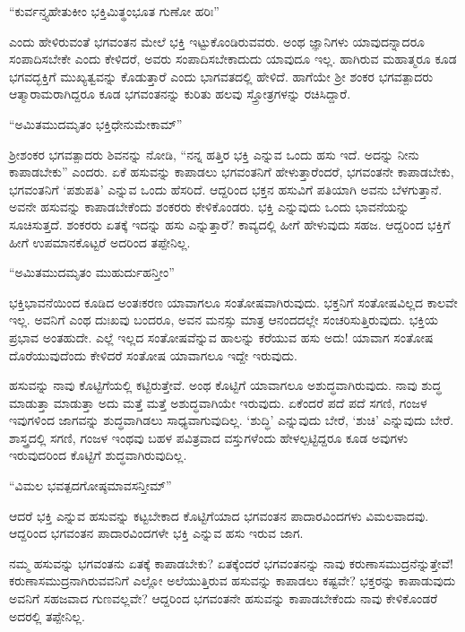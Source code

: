 \begin{shloka}
``ಕುರ್ವನ್ತ್ಯಹೇತುಕೀಂ ಭಕ್ತಿಮಿತ್ಥಂಭೂತ ಗುಣೋ ಹರಿಃ''
\end{shloka}

ಎಂದು ಹೇಳಿರುವಂತೆ ಭಗವಂತನ ಮೇಲೆ ಭಕ್ತಿ ಇಟ್ಟುಕೊಂಡಿರುವವರು. ಅಂಥ ಜ್ಞಾನಿಗಳು ಯಾವುದನ್ನಾದರೂ ಸಂಪಾದಿಸಬೇಕೇ ಎಂದು ಕೇಳಿದರೆ, ಅವರು ಸಂಪಾದಿಸಬೇಕಾದುದು ಯಾವುದೂ ಇಲ್ಲ. ಹಾಗಿರುವ ಮಹಾತ್ಮರೂ ಕೂಡ ಭಗವದ್ಭಕ್ತಿಗೆ ಮುಖ್ಯತ್ವವನ್ನು ಕೊಡುತ್ತಾರೆ ಎಂದು ಭಾಗವತದಲ್ಲಿ ಹೇಳಿದೆ. ಹಾಗೆಯೇ ಶ್ರೀ ಶಂಕರ ಭಗವತ್ಪಾದರು ಆತ್ಮಾರಾಮರಾಗಿದ್ದರೂ ಕೂಡ ಭಗವಂತನನ್ನು ಕುರಿತು ಹಲವು ಸ್ತ್ರೋತ್ರಗಳನ್ನು ರಚಿಸಿದ್ದಾರೆ.

\begin{shloka}
``ಅಮಿತಮುದಮೃತಂ ಭಕ್ತಿಧೇನುಮೇಕಾಮ್''
\end{shloka}

ಶ್ರೀಶಂಕರ ಭಗವತ್ಪಾದರು ಶಿವನನ್ನು ನೋಡಿ, ``ನನ್ನ ಹತ್ತಿರ ಭಕ್ತಿ ಎನ್ನುವ ಒಂದು ಹಸು ಇದೆ. ಅದನ್ನು ನೀನು ಕಾಪಾಡಬೇಕು'' ಎಂದರು. ಏಕೆ ಹಸುವನ್ನು ಕಾಪಾಡಲು ಭಗವಂತನಿಗೆ ಹೇಳುತ್ತಾರೆಂದರೆ, ಭಗವಂತನೇ ಕಾಪಾಡಬೇಕು, ಭಗವಂತನಿಗೆ `ಪಶುಪತಿ' ಎನ್ನುವ ಒಂದು ಹೆಸರಿದೆ. ಆದ್ದರಿಂದ ಭಕ್ತನ ಹಸುವಿಗೆ ಪತಿಯಾಗಿ ಅವನು ಬೆಳಗುತ್ತಾನೆ. ಅವನೇ ಹಸುವನ್ನು ಕಾಪಾಡಬೇಕೆಂದು ಶಂಕರರು ಕೇಳಿಕೊಂಡರು. ಭಕ್ತಿ ಎನ್ನುವುದು ಒಂದು ಭಾವನೆಯನ್ನು ಸೂಚಿಸುತ್ತದೆ. ಶಂಕರರು ಏತಕ್ಕೆ ಇದನ್ನು ಹಸು ಎನ್ನುತ್ತಾರೆ? ಕಾವ್ಯದಲ್ಲಿ ಹೀಗೆ ಹೇಳುವುದು ಸಹಜ. ಆದ್ದರಿಂದ ಭಕ್ತಿಗೆ ಹೀಗೆ ಉಪಮಾನಕೊಟ್ಟರೆ ಅದರಿಂದ ತಪ್ಪೇನಿಲ್ಲ.

\begin{shloka}
``ಅಮಿತಮುದಮೃತಂ ಮುಹುರ್ದುಹನ್ತೀಂ''
\end{shloka}

ಭಕ್ತಿಭಾವನೆಯಿಂದ ಕೂಡಿದ ಅಂತಃಕರಣ ಯಾವಾಗಲೂ ಸಂತೋಷವಾಗಿರುವುದು. ಭಕ್ತನಿಗೆ ಸಂತೋಷವಿಲ್ಲದ ಕಾಲವೇ ಇಲ್ಲ. ಅವನಿಗೆ ಎಂಥ ದುಃಖವು ಬಂದರೂ, ಅವನ ಮನಸ್ಸು ಮಾತ್ರ ಆನಂದದಲ್ಲೇ ಸಂಚರಿಸುತ್ತಿರುವುದು. ಭಕ್ತಿಯ ಪ್ರಭಾವ ಅಂತಹುದೇ. ಎಲ್ಲೆ ಇಲ್ಲದ ಸಂತೋಷವೆನ್ನುವ ಹಾಲನ್ನು ಕರೆಯುವ ಹಸು ಅದು! ಯಾವಾಗ ಸಂತೋಷ ದೊರೆಯುವುದೆಂದು ಕೇಳಿದರೆ ಸಂತೋಷ ಯಾವಾಗಲೂ ಇದ್ದೇ ಇರುವುದು.

ಹಸುವನ್ನು ನಾವು ಕೊಟ್ಟಿಗೆಯಲ್ಲಿ ಕಟ್ಟಿರುತ್ತೇವೆ. ಅಂಥ ಕೊಟ್ಟಿಗೆ ಯಾವಾಗಲೂ ಅಶುದ್ಧವಾಗಿರುವುದು. ನಾವು ಶುದ್ಧ ಮಾಡುತ್ತಾ ಮಾಡುತ್ತಾ ಅದು ಮತ್ತೆ ಮತ್ತೆ ಅಶುದ್ಧವಾಗಿಯೇ ಇರುವುದು. ಏಕೆಂದರೆ ಪದೆ ಪದೆ ಸಗಣಿ, ಗಂಜಳ ಇವುಗಳಿಂದ ಜಾಗವನ್ನು ಶುದ್ಧವಾಗಿಡಲು ಸಾಧ್ಯವಾಗುವುದಿಲ್ಲ. `ಶುದ್ಧಿ' ಎನ್ನುವುದು ಬೇರೆ, `ಶುಚಿ' ಎನ್ನುವುದು ಬೇರೆ. ಶಾಸ್ತ್ರದಲ್ಲಿ ಸಗಣಿ, ಗಂಜಳ ಇಂಥವು ಬಹಳ ಪವಿತ್ರವಾದ ವಸ್ತುಗಳೆಂದು ಹೇಳಲ್ಪಟ್ಟಿದ್ದರೂ ಕೂಡ ಅವುಗಳು ಇರುವುದರಿಂದ ಕೊಟ್ಟಿಗೆ ಶುದ್ಧವಾಗಿರುವುದಿಲ್ಲ.

\begin{shloka}
``ವಿಮಲ ಭವತ್ಪದಗೋಷ್ಠಮಾವಸನ್ತೀಮ್''
\end{shloka}

ಆದರೆ ಭಕ್ತಿ ಎನ್ನುವ ಹಸುವನ್ನು ಕಟ್ಟಬೇಕಾದ ಕೊಟ್ಟಿಗೆಯಾದ ಭಗವಂತನ ಪಾದಾರವಿಂದಗಳು ವಿಮಲವಾದವು. ಆದ್ದರಿಂದ ಭಗವಂತನ ಪಾದಾರವಿಂದಗಳೇ ಭಕ್ತಿ ಎನ್ನುವ ಹಸು ಇರುವ ಜಾಗ.

ನಮ್ಮ ಹಸುವನ್ನು ಭಗವಂತನು ಏತಕ್ಕೆ ಕಾಪಾಡಬೇಕು? ಏತಕ್ಕೆಂದರೆ ಭಗವಂತನನ್ನು ನಾವು ಕರುಣಾಸಮುದ್ರನೆನ್ನುತ್ತೇವೆ! ಕರುಣಾಸಮುದ್ರನಾಗಿರುವವನಿಗೆ ಎಲ್ಲೋ ಅಲೆಯುತ್ತಿರುವ ಹಸುವನ್ನು ಕಾಪಾಡಲು ಕಷ್ಟವೇ? ಭಕ್ತರನ್ನು ಕಾಪಾಡುವುದು ಅವನಿಗೆ ಸಹಜವಾದ ಗುಣವಲ್ಲವೇ? ಆದ್ದರಿಂದ ಭಗವಂತನೇ ಹಸುವನ್ನು ಕಾಪಾಡಬೇಕೆಂದು ನಾವು ಕೇಳಿಕೊಂಡರೆ ಅದರಲ್ಲಿ ತಪ್ಪೇನಿಲ್ಲ.

